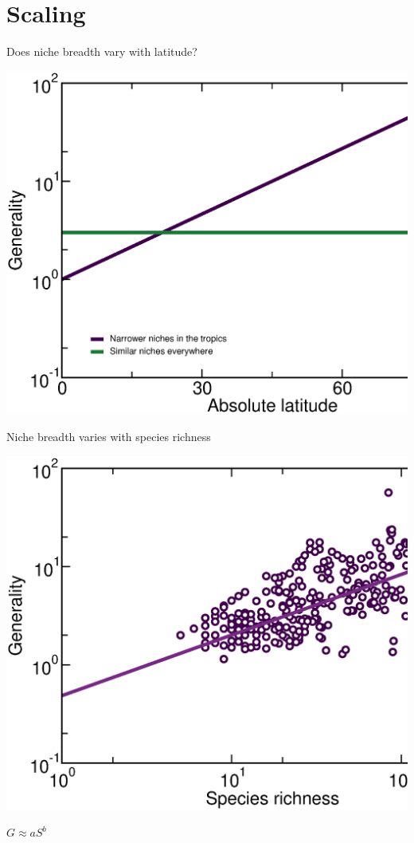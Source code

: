 \documentclass{beamer}
\begin{document}
\section*{Scaling}
  \begin{frame}{Does niche breadth vary with latitude?}

    \begin{center}
      \includegraphics*[width=.8\textwidth]{Figures/results/Gen_vs_lat_simulated.eps}
    \end{center}

  \end{frame}


  \begin{frame}{Niche breadth varies with species richness}

    \begin{center}
      \includegraphics*[width=.654\textwidth]{Figures/results/Gen_dots_vs_S_fitline_observed.eps}

    \vspace{.3cm}
      {\Large      
      $G \approx aS^b$}
    \end{center}
  \end{frame}
\end{document}
